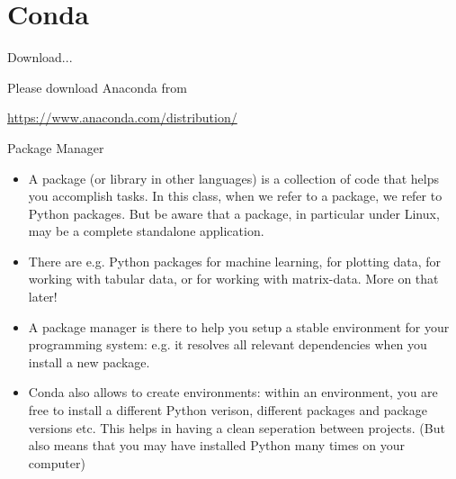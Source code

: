 
\subtitle{Installation of Python in Conda and first steps in Python}
\date{2020-03-26}


\begin{frame}
	\tableofcontents
\end{frame}

\section{Conda}


\begin{frame}{Download...}
	
	Please download Anaconda from
	
	\href{https://www.anaconda.com/distribution/}{https://www.anaconda.com/distribution/}
	
	
\end{frame}

\begin{frame}{Package Manager}
	\begin{itemize}
		
		\item A package (or library in other languages) is a collection of code that helps you accomplish tasks. In this class, when we refer to a package, we refer to Python packages. But be aware that a package, in particular under Linux, may be a complete standalone application.
		\item There are e.g. Python packages for machine learning, for plotting data, for working with tabular data, or for working with matrix-data. More on that later! 
		\item A package manager is there to help you setup a stable environment for your programming system: e.g. it resolves all relevant dependencies when you install a new package.
		\item Conda also allows to create environments: within an environment, you are free to install a different Python verison, different packages and package versions etc. This helps in having a clean seperation between projects. (But also means that you may have installed Python many times on your computer)
	\end{itemize}
	
\end{frame}


